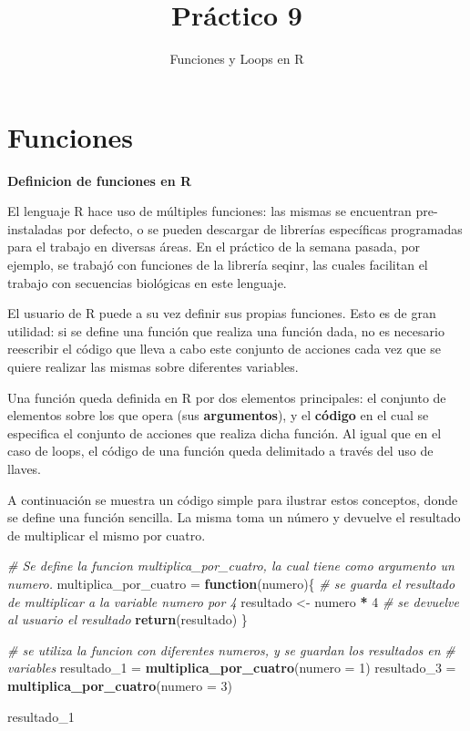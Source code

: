 \documentclass[]{article}
\title{Práctico 9}
\author{Funciones y Loops en R}
\date{}
\newenvironment{Shaded}{\begin{snugshade}}{\end{snugshade}}
\newcommand{\CommentTok}[1]{\textcolor[rgb]{0.56,0.35,0.01}{\textit{#1}}}
\newcommand{\ControlFlowTok}[1]{\textcolor[rgb]{0.13,0.29,0.53}{\textbf{#1}}}
\newcommand{\DataTypeTok}[1]{\textcolor[rgb]{0.13,0.29,0.53}{#1}}
\newcommand{\DecValTok}[1]{\textcolor[rgb]{0.00,0.00,0.81}{#1}}
\newcommand{\KeywordTok}[1]{\textcolor[rgb]{0.13,0.29,0.53}{\textbf{#1}}}
\newcommand{\NormalTok}[1]{#1}
\newcommand{\OperatorTok}[1]{\textcolor[rgb]{0.81,0.36,0.00}{\textbf{#1}}}
\newcommand{\StringTok}[1]{\textcolor[rgb]{0.31,0.60,0.02}{#1}}
\begin{document}
\maketitle

\hypertarget{funciones}{%
\section{Funciones}\label{funciones}}

\textbf{Definicion de funciones en R}

El lenguaje R hace uso de múltiples funciones: las mismas se encuentran
pre-instaladas por defecto, o se pueden descargar de librerías
específicas programadas para el trabajo en diversas áreas. En el
práctico de la semana pasada, por ejemplo, se trabajó con funciones de
la librería seqinr, las cuales facilitan el trabajo con secuencias
biológicas en este lenguaje.

El usuario de R puede a su vez definir sus propias funciones. Esto es de
gran utilidad: si se define una función que realiza una función dada, no
es necesario reescribir el código que lleva a cabo este conjunto de
acciones cada vez que se quiere realizar las mismas sobre diferentes
variables.

Una función queda definida en R por dos elementos principales: el
conjunto de elementos sobre los que opera (sus \textbf{argumentos}), y
el \textbf{código} en el cual se especifica el conjunto de acciones que
realiza dicha función. Al igual que en el caso de loops, el código de
una función queda delimitado a través del uso de llaves.

A continuación se muestra un código simple para ilustrar estos
conceptos, donde se define una función sencilla. La misma toma un número
y devuelve el resultado de multiplicar el mismo por cuatro.

\begin{Shaded}
\begin{Highlighting}[]
    \CommentTok{# Se define la funcion multiplica_por_cuatro, la cual tiene como argumento un numero.}
\NormalTok{    multiplica_por_cuatro =}\StringTok{ }\ControlFlowTok{function}\NormalTok{(numero)\{}
    \CommentTok{# se guarda el resultado de multiplicar a la variable numero por 4}
\NormalTok{    resultado <-}\StringTok{ }\NormalTok{numero }\OperatorTok{*}\StringTok{ }\DecValTok{4}
    \CommentTok{# se devuelve al usuario el resultado}
    \KeywordTok{return}\NormalTok{(resultado)}
\NormalTok{    \}}
    
    \CommentTok{# se utiliza la funcion con diferentes numeros, y se guardan los resultados en }
    \CommentTok{# variables}
\NormalTok{    resultado_}\DecValTok{1}\NormalTok{ =}\StringTok{ }\KeywordTok{multiplica_por_cuatro}\NormalTok{(}\DataTypeTok{numero =} \DecValTok{1}\NormalTok{)}
\NormalTok{    resultado_}\DecValTok{3}\NormalTok{ =}\StringTok{ }\KeywordTok{multiplica_por_cuatro}\NormalTok{(}\DataTypeTok{numero =} \DecValTok{3}\NormalTok{)}
    
\NormalTok{    resultado_}\DecValTok{1}
\end{Highlighting}
\end{Shaded}
\end{document}

